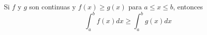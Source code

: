 \item Si $f$ y $g$ son continuas y $f(x) \ge g(x)$ para $a \le x \le b$, entonces
$$\int_a^b f(x) dx \ge \int_a^b g(x) dx$$
